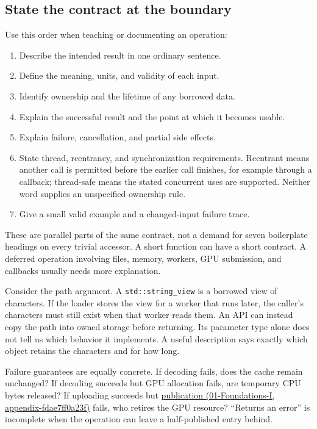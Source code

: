 \subsection{State the contract at the boundary}\label{05-engine-i-ch008-state-the-contract-at-the-boundary}

Use this order when teaching or documenting an operation:

\begin{enumerate}
\def\labelenumi{\arabic{enumi}.}
\tightlist
\item
  Describe the intended result in one ordinary sentence.
\item
  Define the meaning, units, and validity of each input.
\item
  Identify ownership and the lifetime of any borrowed data.
\item
  Explain the successful result and the point at which it becomes usable.
\item
  Explain failure, cancellation, and partial side effects.
\item
  State thread, reentrancy, and synchronization requirements. Reentrant means another call is permitted before the earlier call finishes, for example through a callback; thread-safe means the stated concurrent uses are supported. Neither word supplies an unspecified ownership rule.
\item
  Give a small valid example and a changed-input failure trace.
\end{enumerate}

These are parallel parts of the same contract, not a demand for seven boilerplate headings on every trivial accessor. A short function can have a short contract. A deferred operation involving files, memory, workers, GPU submission, and callbacks usually needs more explanation.

Consider the path argument. A \texttt{std::string\_view} is a borrowed view of characters. If the loader stores the view for a worker that runs later, the caller's characters must still exist when that worker reads them. An API can instead copy the path into owned storage before returning. Its parameter type alone does not tell us which behavior it implements. A useful description says exactly which object retains the characters and for how long.

Failure guarantees are equally concrete. If decoding fails, does the cache remain unchanged? If decoding succeeds but GPU allocation fails, are temporary CPU bytes released? If uploading succeeds but \href{../01-Foundations-I/main.pdf\#nameddest=appendix-fdae7ff0a23f}{publication (01-Foundations-I, appendix-fdae7ff0a23f)} fails, who retires the GPU resource? ``Returns an error'' is incomplete when the operation can leave a half-published entry behind.

